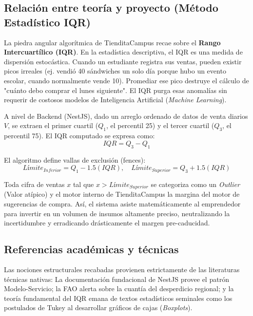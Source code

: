 \documentclass[12pt, a4paper]{article}
\begin{document}
\subsection{Relación entre teoría y proyecto (Método Estadístico IQR)}
La piedra angular algorítmica de TienditaCampus recae sobre el \textbf{Rango Intercuartílico (IQR)}. En la estadística descriptiva, el IQR es una medida de dispersión estocástica. Cuando un estudiante registra sus ventas, pueden existir picos irreales (ej. vendió 40 sándwiches un solo día porque hubo un evento escolar, cuando normalmente vende 10). Promediar ese pico destruye el cálculo de "cuánto debo comprar el lunes siguiente". El IQR purga esas anomalías sin requerir de costosos modelos de Inteligencia Artificial (\textit{Machine Learning}).

A nivel de Backend (NestJS), dado un arreglo ordenado de datos de venta diarios $V$, se extraen el primer cuartil ($Q_1$, el percentil 25) y el tercer cuartil ($Q_3$, el percentil 75). El IQR computado se expresa como:
\begin{equation}
IQR = Q_3 - Q_1
\end{equation}

El algoritmo define vallas de exclusión (fences):
\begin{equation}
Límite_{Inferior} = Q_1 - 1.5(IQR), \quad Límite_{Superior} = Q_3 + 1.5(IQR)
\end{equation}

Toda cifra de ventas $x$ tal que $x > Límite_{Superior}$ se categoriza como un \textit{Outlier} (Valor atípico) y el motor interno de TienditaCampus la margina del motor de sugerencias de compra. Así, el sistema asiste matemáticamente al emprendedor para invertir en un volumen de insumos altamente preciso, neutralizando la incertidumbre y erradicando drásticamente el margen pre-caducidad.

\subsection{Referencias académicas y técnicas}
Las nociones estructurales recabadas provienen estrictamente de las literaturas técnicas nativas: La documentación fundacional de NestJS provee el patrón Modelo-Servicio; la FAO alerta sobre la cuantía del desperdicio regional; y la teoría fundamental del IQR emana de textos estadísticos seminales como los postulados de Tukey al desarrollar gráficos de cajas (\textit{Boxplots}).

\end{document}
